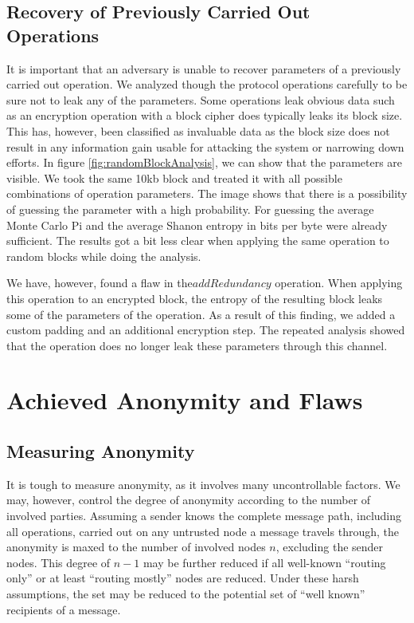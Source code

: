 \subsection{Recovery of Previously Carried Out Operations}
It is important that an adversary is unable to recover parameters of a previously carried out operation. We analyzed though the protocol operations carefully to be sure not to leak any of the parameters. Some operations leak obvious data such as an encryption operation with a block cipher does typically leaks its block size. This has, however, been classified as invaluable data as the block size does not result in any information gain usable for attacking the system or narrowing down efforts. In figure \ref{fig:randomBlockAnalysis}, we can show that the parameters are visible. We took the same 10kb block and treated it with all possible combinations of operation parameters. The image shows that there is a possibility of guessing the parameter with a high probability. For guessing the average Monte Carlo Pi and the average Shanon entropy in bits per byte were already sufficient. The results got a bit less clear when applying the same operation to random blocks while doing the analysis. 

We have, however, found a flaw in the$addRedundancy$ operation. When applying this operation to an encrypted block, the entropy of the resulting block leaks some of the parameters of the operation. As a result of this finding, we added a custom padding and an additional encryption step. The repeated analysis showed that the operation does no longer leak these parameters through this channel.


\section{Achieved Anonymity and Flaws}
\subsection{Measuring Anonymity}
It is tough to measure anonymity, as it involves many uncontrollable factors. We may, however, control the degree of anonymity according to the number of involved parties. Assuming a sender knows the complete message path, including all operations, carried out on any untrusted node a message travels through, the anonymity is maxed to the number of involved nodes $n$, excluding the sender nodes. This degree of $n-1$ may be further reduced if all well-known ``routing only'' or at least ``routing mostly'' nodes are reduced. Under these harsh assumptions, the set may be reduced to the potential set of ``well known'' recipients of a message.

